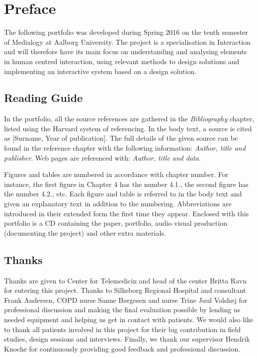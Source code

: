 \chapter{Preface}

The following portfolio was developed during Spring 2016 on the tenth semester of Medialogy at Aalborg University. The project is a specialisation in Interaction and will therefore have its main focus on understanding and analysing elements in human centred interaction, using relevant methods to design solutions and implementing an interactive system based on a design solution.

\section*{Reading Guide}
In the portfolio, all the source references are gathered in the \textit{Bibliography} chapter, listed using the Harvard system of referencing. In the body text, a source is cited as [Surname, Year of publication]. The full details of the given source can be found in the reference chapter with the following information: \textit{Author, title and publisher}. Web pages are referenced with: \textit{Author, title and data}.

Figures and tables are numbered in accordance with chapter number. For instance, the first figure in Chapter 4 has the number 4.1., the second figure has the number 4.2., etc. Each figure and table is referred to in the body text and given an explanatory text in addition to the numbering. Abbreviations are introduced in their extended form the first time they appear. Enclosed with this portfolio is a CD containing the paper, portfolio, audio visual production (documenting the project) and other extra materials. 

\section*{Thanks}
Thanks are given to Center for Telemedicin and head of the center Britta Ravn for entering this project. Thanks to Silkeborg Regional Hospital and consultant Frank Andersen, COPD nurse Sanne B{\o}rgesen and nurse Trine Juul Volsh{\o}j for professional discussion and making the final evaluation possible by lending us needed equipment and helping us get in contact with patients. We would also like to thank all patients involved in this project for their big contribution in field studies, design sessions and interviews. 
Finally, we thank our supervisor Hendrik Knoche for continuously providing good feedback and professional discussion.